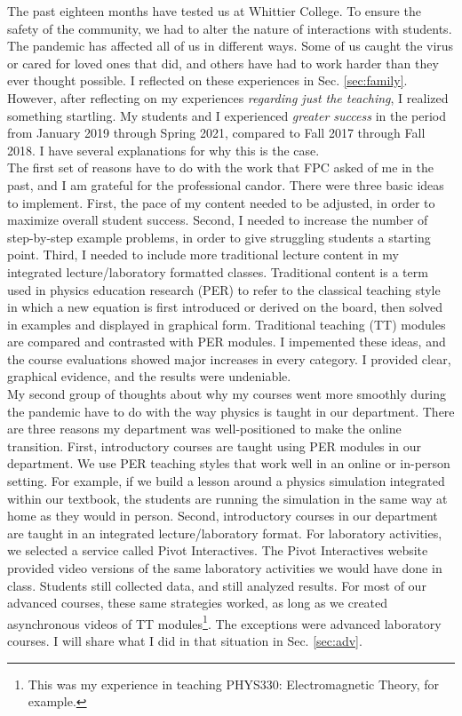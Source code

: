 \documentclass[../../../main.tex]{subfiles}
\begin{document}
The past eighteen months have tested us at Whittier College.  To ensure the safety of the community, we had to alter the nature of interactions with students.  The pandemic has affected all of us in different ways.  Some of us caught the virus or cared for loved ones that did, and others have had to work harder than they ever thought possible.  I reflected on these experiences in Sec. \ref{sec:family}.  However, after reflecting on my experiences \textit{regarding just the teaching}, I realized something startling.  My students and I experienced \textit{greater success} in the period from January 2019 through Spring 2021, compared to Fall 2017 through Fall 2018.  I have several explanations for why this is the case.
\\
\vspace{0.25cm}
The first set of reasons have to do with the work that FPC asked of me in the past, and I am grateful for the professional candor.  There were three basic ideas to implement.  First, the pace of my content needed to be adjusted, in order to maximize overall student success.  Second, I needed to increase the number of step-by-step example problems, in order to give struggling students a starting point.  Third, I needed to include more traditional lecture content in my integrated lecture/laboratory formatted classes.  Traditional content is a term used in physics education research (PER) to refer to the classical teaching style in which a new equation is first introduced or derived on the board, then solved in examples and displayed in graphical form.  Traditional teaching (TT) modules are compared and contrasted with PER modules. I impemented these ideas, and the course evaluations showed major increases in every category.  I provided clear, graphical evidence, and the results were undeniable.
\\
\vspace{0.25cm}
My second group of thoughts about why my courses went more smoothly during the pandemic have to do with the way physics is taught in our department.  There are three reasons my department was well-positioned to make the online transition.  First, introductory courses are taught using PER modules in our department.  We use PER teaching styles that work well in an online or in-person setting.  For example, if we build a lesson around a physics simulation integrated within our textbook, the students are running the simulation in the same way at home as they would in person.  Second, introductory courses in our department are taught in an integrated lecture/laboratory format.  For laboratory activities, we selected a service called Pivot Interactives.  The Pivot Interactives website provided video versions of the same laboratory activities we would have done in class.  Students still collected data, and still analyzed results.  For most of our advanced courses, these same strategies worked, as long as we created asynchronous videos of TT modules\footnote{This was my experience in teaching PHYS330: Electromagnetic Theory, for example.}.  The exceptions were advanced laboratory courses.  I will share what I did in that situation in Sec. \ref{sec:adv}.
\end{document}
